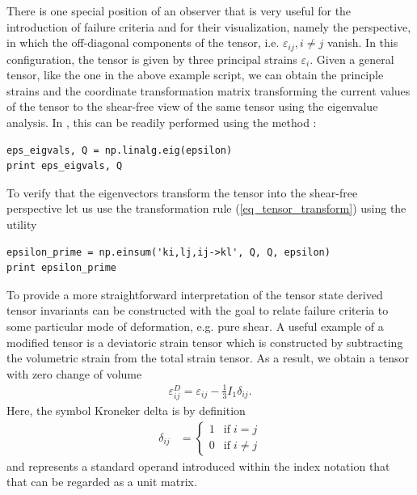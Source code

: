 \documentclass[main.tex]{subfiles}
\begin{document}
There is one special position of an observer that is very useful
for the introduction of failure criteria and for their visualization, namely the
perspective, in which the off-diagonal components of the tensor, i.e. 
$\varepsilon_{ij}, i\neq j$ vanish. 
In this configuration, the tensor is given by three principal strains 
$\varepsilon_i$. Given a general tensor, like the one in the above example script,
we can obtain the principle strains and the coordinate transformation matrix 
transforming the current values of the tensor to the shear-free view of the same tensor
using the eigenvalue analysis.
In , this can be readily performed using the method :
\begin{lstlisting}[name=Evaluation of principal strains, frame=none]
eps_eigvals, Q = np.linalg.eig(epsilon)
print eps_eigvals, Q
\end{lstlisting}
To verify that the eigenvectors  transform the tensor  into the 
shear-free perspective let us use the transformation rule (\ref{eq_tensor_transform}) using the
 utility
\begin{lstlisting}[name=Verification of shear-free tensor configuration, frame=none]
epsilon_prime = np.einsum('ki,lj,ij->kl', Q, Q, epsilon)
print epsilon_prime
\end{lstlisting}

To provide a more straightforward interpretation of the tensor state 
derived tensor invariants can be constructed with the goal to relate failure criteria
to some particular mode of deformation, e.g. pure shear. 
A useful example of a modified tensor is a deviatoric strain tensor which 
is constructed by subtracting the volumetric strain from the total strain tensor.
As a result, we obtain a tensor with zero change of volume
\begin{align}
    \label{EQ:deviatoric_stress}
    \varepsilon^D_{ij} = \varepsilon_{ij} - \frac{1}{3} I_1 \delta_{ij}. 
\end{align}
Here, the symbol Kroneker delta is by definition 
\begin{align}
\delta_{ij} & = 
\left\{
\begin{array}{cl}
1     &  \mathrm{if} \; i = j \\
0     &  \mathrm{if} \; i \neq j
\end{array}
\right.
\end{align}
and represents a standard operand introduced within the index notation that that can be regarded as a unit matrix.
\end{document}
